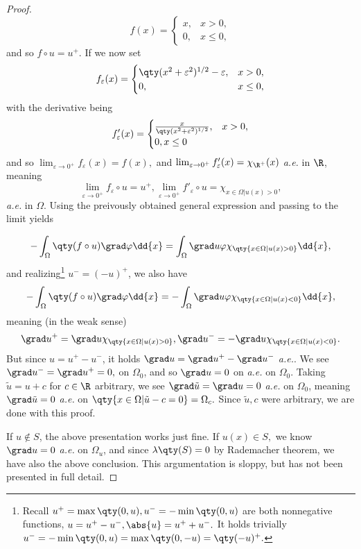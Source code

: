 \begin{proof}
\[
	f(x) =
	\begin{cases}
		x, & x>0,\\
		0, & x\leq 0,
	\end{cases}
\]
and so $f \circ u = u^{+}.$ If we now set
\[
	f_{\varepsilon}(x) =
	\begin{cases}
		\qty(x^{2}+\varepsilon^{2})^{1/2} - \varepsilon, & x > 0, \\
		0, & x\leq 0,
	\end{cases}
\]
with the derivative being
\[
	f'_{\varepsilon}(x) =
	\begin{cases}
		\frac{x}{\qty(x^{2}+\varepsilon^{2})^{1/2}}, & x >0, \\
		0, x \leq 0
	\end{cases}
\]
and so $\lim_{\varepsilon \to 0^+}f_{\varepsilon}(x) = f(x),$ and $\lim_{\varepsilon \to 0^+}f'_{\varepsilon}(x) = \chi_{\R^+}(x) $ \textit{a.e.} in $\R$, meaning
\[
	\lim_{\varepsilon \to 0^+}f_{\varepsilon}\circ u = u^+, \lim_{\varepsilon \to 0^+}f'_{\varepsilon}\circ u = \chi_{x \in \Omega| u(x) > 0},
\]
\textit{a.e.} in $\Omega$. Using the preivously obtained general expression and passing to the limit yields

\[
	- \int_{\Omega}\qty(f \circ u)\grad \varphi\dd{x} = \int_{\Omega}\grad u \varphi \chi_{\qty{x\in \Omega| u(x) > 0}}\dd{x},
\]
and realizing\footnote{Recall $u^+ = \max\qty(0, u), u^- = -\min\qty(0, u)$ are both nonnegative functions, $u = u^+ - u^-, \abs{u} = u^+ + u^-.$ It holds trivially $u^- = - \min\qty(0, u) = \max\qty(0, -u) = \qty(-u)^{+}.$} $u^- = (-u)^+$, we also have
\[
	- \int_{\Omega}\qty(f \circ u)\grad \varphi\dd{x} = -\int_{\Omega}\grad u \varphi \chi_{\qty{x\in \Omega| u(x) < 0}}\dd{x},
\]
meaning (in the weak sense)
\[
	\grad u^+ = \grad u \chi_{\qty{x \in \Omega | u(x) >0}}, \grad u^- = -\grad u\chi_{\qty{x \in \Omega | u(x) <0}}.
\]
But since $u = u^+ - u^-$, it holds $\grad u = \grad u^+ - \grad u^-$ \textit{a.e.}. We see $\grad u^- = \grad u^+ = 0,$ on $\Omega_0$, and so $\grad u = 0$ on \textit{a.e.} on $\Omega_0.$ Taking $\tilde{u} = u + c$ for $c \in \R$ arbitrary, we see $\grad \tilde{u} = \grad u = 0$ \textit{a.e.} on $\Omega_0$, meaning $\grad \tilde{u} = 0$ \textit{a.e.} on $\qty{x \in \Omega| \tilde{u}-c = 0} = \Omega_c.$ Since $\tilde{u}, c$ were arbitrary, we are done with this proof.

If $u \notin S$, the above presentation works just fine. If $u(x) \in S,$ we know $\grad u = 0$ \textit{a.e.} on $\Omega_u$, and since $\lambda\qty(S) = 0$ by Rademacher theorem, we have also the above conclusion. This argumentation is sloppy, but has not been presented in full detail.

\end{proof}

